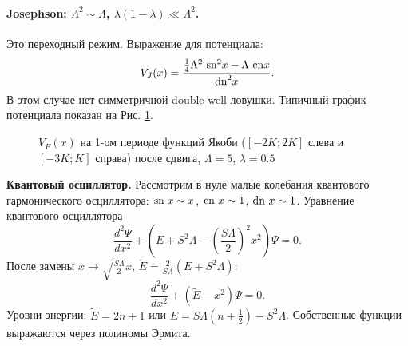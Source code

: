 \documentclass[12pt]{article}
\begin{document}
\paragraph{Josephson: $\Lambda^2 \sim \Lambda$, $\lambda(1 - \lambda) \ll \Lambda^2$.}
Это переходный режим.
Выражение для потенциала:
%
\begin{equation}
V_J(x) = \frac{\frac{1}{4} \Lambda^2 ~\textrm{sn}^2 x - \Lambda~\textrm{cn} x}{\textrm{dn}^2 x}.
\end{equation}
%
В этом случае нет симметричной double-well ловушки.
Типичный график потенциала показан на Рис. \ref{pic:potential_josephson}.
%
\begin{figure}[Ht!]
\caption{$V_F (x)$ на 1-ом периоде функций Якоби ($[-2K; 2K]$ слева и $[-3K; K]$ справа) после сдвига, $\Lambda = 5$, $\lambda = 0.5$}
\label{pic:potential_josephson}
\end{figure}
%

\textbf{Квантовый осциллятор.}
Рассмотрим в нуле малые колебания квантового гармонического осциллятора: $\textrm{sn}~x \sim x$, $\textrm{cn}~x \sim 1$, $\textrm{dn}~x \sim 1$.
Уравнение квантового осциллятора
%
\begin{equation}
\frac{d^2 \Psi}{dx^2} + (E + S^2 \Lambda - \left( \frac{S \Lambda}{2} \right)^2 x^2) \Psi = 0.
\end{equation}
%
После замены $x \to \sqrt{\frac{S \Lambda}{2}} x$, $\tilde{E} = \frac{2}{S \Lambda} (E + S^2 \Lambda)$:
%
\begin{equation}
\frac{d^2 \Psi}{dx^2} + (\tilde{E} - x^2) \Psi = 0.
\end{equation}
%
Уровни энергии: $\tilde{E} = 2n + 1$ или $E = S \Lambda (n + \frac{1}{2}) - S^2 \Lambda$.
Собственные функции выражаются через полиномы Эрмита.
\end{document}
